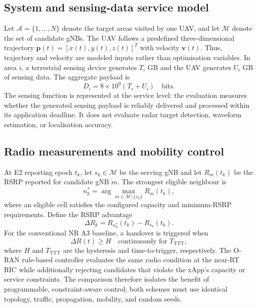 
\subsection{System and sensing-data service model}

Let $\mathcal{A}=\{1,\ldots,N\}$ denote the target areas visited by one UAV,
and let $\mathcal{M}$ denote the set of candidate gNBs. The UAV follows a
predefined three-dimensional trajectory $\mathbf{p}(t)=[x(t),y(t),z(t)]^T$
with velocity $\mathbf{v}(t)$. Thus, trajectory and velocity are modeled
inputs rather than optimisation variables. In area $i$, a terrestrial sensing
device generates $T_i$ GB and the UAV generates $U_i$ GB of sensing data. The
aggregate payload is
\begin{equation}
    D_i = 8\times 10^9(T_i+U_i) \quad \text{bits}.
    \label{eq:payload}
\end{equation}
The sensing function is represented at the service level: the evaluation
measures whether the generated sensing payload is reliably delivered and
processed within its application deadline. It does not evaluate radar target
detection, waveform estimation, or localisation accuracy.

\subsection{Radio measurements and mobility control}

At E2 reporting epoch $t_k$, let $s_k\in\mathcal{M}$ be the serving gNB and
let $R_m(t_k)$ be the RSRP reported for candidate gNB $m$. The strongest
eligible neighbour is
\begin{equation}
    n_k^* = \arg\max_{m\in\mathcal{M}\setminus\{s_k\}} R_m(t_k),
    \label{eq:best-neighbour}
\end{equation}
where an eligible cell satisfies the configured capacity and minimum-RSRP
requirements. Define the RSRP advantage
\begin{equation}
    \Delta R_k = R_{n_k^*}(t_k)-R_{s_k}(t_k).
    \label{eq:rsrp-margin}
\end{equation}
For the conventional NR A3 baseline, a handover is triggered when
\begin{equation}
    \Delta R(t) \geq H
    \quad \text{continuously for } T_{\mathrm{TTT}},
    \label{eq:a3}
\end{equation}
where $H$ and $T_{\mathrm{TTT}}$ are the hysteresis and time-to-trigger,
respectively. The O-RAN rule-based controller evaluates the same radio
condition at the near-RT RIC while additionally rejecting candidates that
violate the xApp's capacity or service constraints. The comparison therefore
isolates the benefit of programmable, constraint-aware control; both schemes
must use identical topology, traffic, propagation, mobility, and random seeds.

